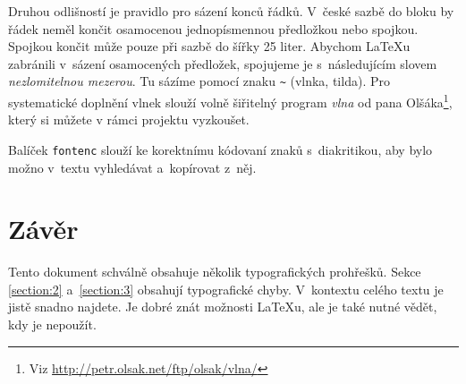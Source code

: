 \documentclass[10pt, a4paper, twocolumn]{article}
\begin{document}
Druhou odlišností je pravidlo pro sázení konců řádků.
V~české sazbě do bloku by řádek neměl končit osamocenou jednopísmennou předložkou nebo spojkou.
Spojkou  končit může pouze při sazbě do šířky 25 liter.
Abychom \LaTeX u zabránili v~sázení osamocených předložek, spojujeme je s~následujícím slovem \emph{nezlomitelnou mezerou}.
Tu sázíme pomocí znaku {\texttt \~{}} (vlnka, tilda).
Pro systematické doplnění vlnek slouží volně šiřitelný program \emph{vlna} od pana Olšáka\footnote{Viz \url{http://petr.olsak.net/ftp/olsak/vlna/}}, který si můžete v rámci projektu vyzkoušet.

Balíček \texttt{fontenc} slouží ke korektnímu kódovaní znaků s~diakritikou, aby bylo možno v~textu vyhledávat a~kopírovat z~něj.


\section{Závěr}

Tento dokument schválně obsahuje několik typografických prohřešků.
Sekce \ref{section:2} a~\ref{section:3} obsahují typografické chyby.
V~kontextu celého textu je jistě snadno najdete.
Je dobré znát možnosti \LaTeX u, ale je také nutné vědět, kdy je nepoužít.
\end{document}
